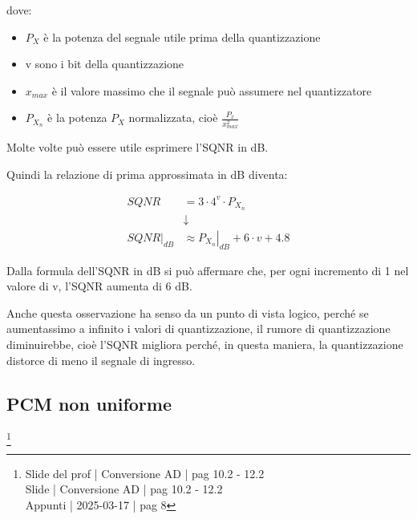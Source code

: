 dove: 

\begin{itemize}
    \item $P_X$ è la potenza del segnale utile prima della quantizzazione 
    \item v sono i bit della quantizzazione 
    \item $x_{max}$ è il valore massimo che il segnale può assumere nel quantizzatore 
    \item $P_{X_n}$ è la potenza $P_X$ normalizzata, cioè $\frac{P_x}{x_{max} ^{2}}$
\end{itemize}

Molte volte può essere utile esprimere l'SQNR in dB. \newline 

Quindi la relazione di prima approssimata in dB diventa: 

{
    \Large 
    \begin{equation}
        \begin{split}
            SQNR &= 3 \cdot 4^{v} \cdot P_{X_n}
            \\
            &\downarrow
            \\
            \left.
            SQNR 
            \right|_{dB}
            &\approx
            \left.
                P_{X_n}
            \right|_{dB}
            + 
            6 \cdot v 
            +
            4.8
        \end{split}
    \end{equation}
}

Dalla formula dell'SQNR in dB si può affermare che, 
per ogni incremento di 1 nel valore di v, 
l'SQNR aumenta di 6 dB. \newline 

Anche questa osservazione ha senso da un punto di vista logico, 
perché se aumentassimo a infinito i valori di quantizzazione, il rumore di quantizzazione diminuirebbe, 
cioè l'SQNR migliora perché, in questa maniera, la quantizzazione distorce di meno il segnale di ingresso. \newline 

\newpage 

\subsection{PCM non uniforme}
\footnote{Slide del prof | Conversione AD | pag 10.2 - 12.2\\  
Slide | Conversione AD | pag 10.2 - 12.2 \\
Appunti | 2025-03-17 | pag 8
}

